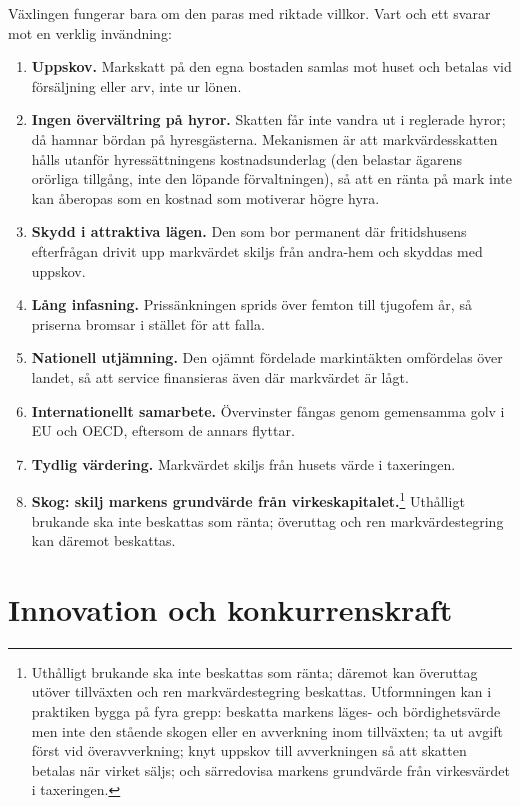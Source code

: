\documentclass[11pt]{article}
\begin{document}
Växlingen fungerar bara om den paras med riktade villkor. Vart och ett svarar mot en verklig invändning:

\begin{enumerate}
\item \textbf{Uppskov.} Markskatt på den egna bostaden samlas mot huset och betalas vid försäljning eller arv, inte ur lönen.
\item \textbf{Ingen övervältring på hyror.} Skatten får inte vandra ut i reglerade hyror; då hamnar bördan på hyresgästerna. Mekanismen är att markvärdesskatten hålls utanför hyressättningens kostnadsunderlag (den belastar ägarens orörliga tillgång, inte den löpande förvaltningen), så att en ränta på mark inte kan åberopas som en kostnad som motiverar högre hyra.
\item \textbf{Skydd i attraktiva lägen.} Den som bor permanent där fritidshusens efterfrågan drivit upp markvärdet skiljs från andra-hem och skyddas med uppskov.
\item \textbf{Lång infasning.} Prissänkningen sprids över femton till tjugofem år, så priserna bromsar i stället för att falla.
\item \textbf{Nationell utjämning.} Den ojämnt fördelade markintäkten omfördelas över landet, så att service finansieras även där markvärdet är lågt.
\item \textbf{Internationellt samarbete.} Övervinster fångas genom gemensamma golv i EU och OECD, eftersom de annars flyttar.
\item \textbf{Tydlig värdering.} Markvärdet skiljs från husets värde i taxeringen.
\item \textbf{Skog: skilj markens grundvärde från virkeskapitalet.}\footnote{Uthålligt brukande ska inte beskattas som ränta; däremot kan överuttag utöver tillväxten och ren markvärdestegring beskattas. Utformningen kan i praktiken bygga på fyra grepp: beskatta markens läges- och bördighetsvärde men inte den stående skogen eller en avverkning inom tillväxten; ta ut avgift först vid överavverkning; knyt uppskov till avverkningen så att skatten betalas när virket säljs; och särredovisa markens grundvärde från virkesvärdet i taxeringen.} Uthålligt brukande ska inte beskattas som ränta; överuttag och ren markvärdestegring kan däremot beskattas.
\end{enumerate}

\section{Innovation och konkurrenskraft}
\end{document}
